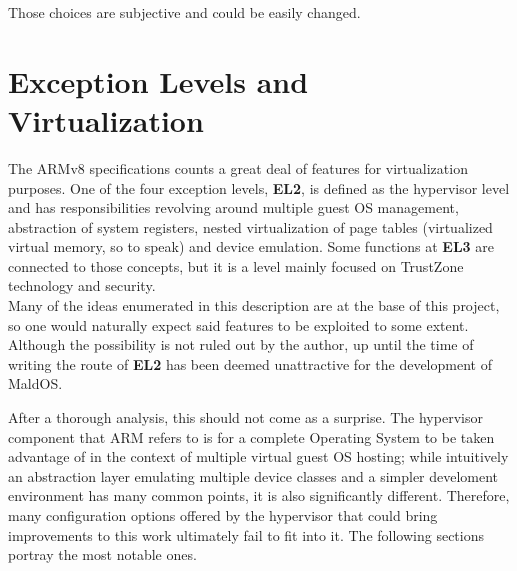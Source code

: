\documentclass[12pt,a4paper,openright,twoside]{report}
\begin{document}
Those choices are subjective and could be easily changed.

\section{Exception Levels and Virtualization}
The ARMv8 specifications counts a great deal of features for virtualization
purposes. One of the four exception levels, \textbf{EL2}, is defined as the
hypervisor level and has responsibilities revolving around multiple guest OS management,
abstraction of system registers, nested virtualization of page tables (virtualized
virtual memory, so to speak) and device emulation. Some functions at \textbf{EL3} 
are connected to those concepts, but it is a level mainly focused on TrustZone 
technology and security. \\
Many of the ideas enumerated in this description are at the base of this project,
so one would naturally expect said features to be exploited to some extent.
Although the possibility is not ruled out by the author, up until the time of 
writing the route of \textbf{EL2} has been deemed unattractive for the development
of MaldOS.

After a thorough analysis, this should not come as a surprise. The hypervisor 
component that ARM refers to is for a complete Operating System to be taken advantage
of in the context of multiple virtual guest OS hosting; while intuitively an 
abstraction layer emulating multiple device classes and a simpler develoment 
environment has many common points, it is also significantly different. Therefore,
many configuration options offered by the hypervisor that could bring improvements to this
work ultimately fail to fit into it. The following sections portray the most 
notable ones.
\end{document}
